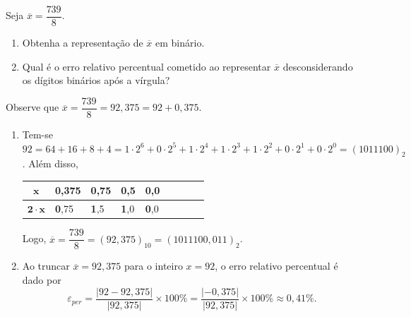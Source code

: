 \documentclass[12pt,a4paper]{article}
\begin{document}
\begin{ExerciseList}
\Exercise[title={2,5}]
Seja $\overline{x} = \dfrac{739}{8}$.
\begin{enumerate}
\item Obtenha a representação de $\overline{x}$ em binário.
\item Qual é o erro relativo percentual cometido ao representar $\overline{x}$ desconsiderando os dígitos binários após a vírgula?
\end{enumerate}
\Answer
Observe que $\overline{x} = \dfrac{739}{8} = 92,375 = 92 + 0,375$.
\begin{enumerate}
\item Tem-se $92 = 64 + 16 + 8 + 4
= 1 \cdot 2^6
+ 0 \cdot 2^5
+ 1 \cdot 2^4
+ 1 \cdot 2^3
+ 1 \cdot 2^2
+ 0 \cdot 2^1
+ 0 \cdot 2^0 = (1011100)_{2}$. Além disso,
\begin{center}
\begin{tabular}{|c|l|l|l|l|l|l|l|l|}
\hline
$\mathbf{x}$       
& 0,375 & 0,75 & 0,5 & 0,0 \\ \hline
$\mathbf{2\cdot x}$
& \textbf{0},75
& \textbf{1},5
& \textbf{1},0
& \textbf{0},0
\\ \hline
\end{tabular}
\end{center}
Logo, $\overline{x}
= \dfrac{739}{8}
= (92,375)_{10}
= (1011100,011)_2$.

\item Ao truncar $\overline{x} = 92,375$ para o inteiro $x = 92$, o erro relativo percentual é dado por
\[
\varepsilon_{per}
= \frac{|92 - 92,375|}{|92,375|} \times 100\%
= \frac{|-0,375|}{|92,375|} \times 100\%
\approx 0,41\%.
\]
\end{enumerate}


\end{ExerciseList}
\end{document}
